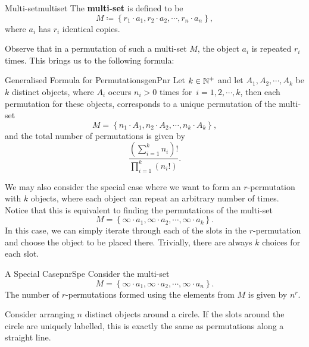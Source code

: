 \documentclass[math]{amznotes}
\theoremstyle{remark}
\newcommand{\0}{\mathbf{0}}
\newcommand{\1}{\mathbf{1}}
\begin{document}
\begin{dfnbox}{Multi-set}{multiset}
    The {\color{red} \textbf{multi-set}} is defined to be
    \begin{equation*}
        M \coloneqq \left\{r_1 \cdot a_1, r_2 \cdot a_2, \cdots, r_n \cdot a_n\right\},
    \end{equation*}
    where $a_i$ has $r_i$ identical copies.
\end{dfnbox}
Observe that in a permutation of such a multi-set $M$, the object $a_i$ is repeated $r_i$ times. This brings us to the following formula:
\begin{probox}{Generalised Formula for Permutations}{genPnr}
    Let $k \in \mathbb{N}^+$ and let $A_1, A_2, \cdots, A_k$ be $k$ distinct objects, where $A_i$ occurs $n_i > 0$ times for~$i = 1, 2, \cdots, k$, then each permutation for these objects, corresponds to a unique permutation of the multi-set
    \begin{displaymath}
        M = \left\{n_1 \cdot A_1, n_2 \cdot A_2, \cdots, n_k \cdot A_k\right\},
    \end{displaymath}
    and the total number of permutations is given by
    \begin{equation*}
        \frac{\left(\sum_{i = 1}^{k}n_i\right)!}{\prod_{i = 1}^{k}\left(n_i!\right)}.
    \end{equation*}
\end{probox}
We may also consider the special case where we want to form an $r$-permutation with $k$ objects, where each object can repeat an arbitrary number of times. Notice that this is equivalent to finding the permutations of the multi-set
\begin{displaymath}
    M = \left\{\infty \cdot a_1, \infty \cdot a_2, \cdots, \infty \cdot a_k\right\}.
\end{displaymath}
In this case, we can simply iterate through each of the slots in the $r$-permutation and choose the object to be placed there. Trivially, there are always $k$ choices for each slot.
\begin{probox}{A Special Case}{pnrSpe}
    Consider the multi-set
    \begin{displaymath}
        M = \left\{\infty \cdot a_1, \infty \cdot a_2, \cdots, \infty \cdot a_n\right\}.
    \end{displaymath}
    The number of $r$-permutations formed using the elements from $M$ is given by $n^r$.
\end{probox}
Consider arranging $n$ distinct objects around a circle. If the slots around the circle are uniquely labelled, this is exactly the same as permutations along a straight line.
\end{document}
